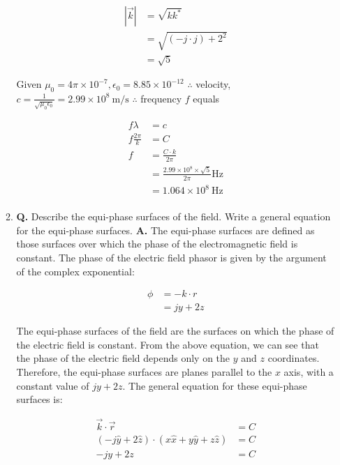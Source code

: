 \documentclass[main.tex]{subfiles}
\begin{document}
\begin{enumerate}
\begin{enumerate}
        $$
        \begin{aligned}
        |\vec{k}| &=\sqrt{k k^*}\\
        &= \sqrt{(-j \cdot j)+2^2}\\
        &= \sqrt{5}
        \end{aligned}
        $$
        
        Given $\mu_0=4 \pi \times 10^{-7}, \epsilon_0=8.85 \times 10^{-12}$
        $\therefore$ velocity, $c=\frac{1}{\sqrt{\mu_0 \epsilon_0}}=2.99 \times 10^8 \mathrm{~m} / \mathrm{s}$ $\therefore$ frequency $f$ equals 
        
        $$
        \begin{aligned}
        f \lambda &=c \\
        f \frac{2 \pi}{k} &= C \\
        f &=\frac{C \cdot k}{2 \pi}\\
        &= \frac{2.99 \times 10^8 \times \sqrt{5}}{2 \pi} \mathrm{Hz} \\
        &= 1.064 \times 10^8 \mathrm{~Hz} \\
        \end{aligned}
        $$
        
        \item \textbf{Q.} Describe the equi-phase surfaces of the field. Write a general equation for the equi-phase surfaces. \textbf{A.} The equi-phase surfaces are defined as those surfaces over which the phase of the electromagnetic field is constant. The phase of the electric field phasor is given by the argument of the complex exponential:

        $$
        \begin{aligned}
        \phi &= -k \cdot r \\
        &=jy + 2z
        \end{aligned}
        $$

        The equi-phase surfaces of the field are the surfaces on which the phase of the electric field is constant. From the above equation, we can see that the phase of the electric field depends only on the $y$ and $z$ coordinates. Therefore, the equi-phase surfaces are planes parallel to the $x$ axis, with a constant value of $jy+2z$. The general equation for these equi-phase surfaces is:

        $$
        \begin{aligned}
        \vec{k} \cdot \vec{r} &= C\\
        (-j \hat{y}+2 \hat{z}) \cdot(x \hat{x}+y \hat{y}+z \hat{z}) &= C\\
        -j y+2 z &= C
        \end{aligned}
        $$


\end{enumerate}
\end{enumerate}
\end{document}
